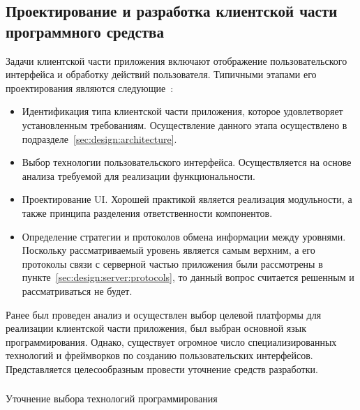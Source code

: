 \subsection{Проектирование и разработка клиентской части программного средства}
\label{sec:design:client}

Задачи клиентской части приложения включают отображение пользовательского интерфейса и обработку действий пользователя. Типичными этапами его проектирования являются следующие~\cite[с.~78]{applicationArchitectureGuide}:

\begin{itemize}
	\item Идентификация типа клиентской части приложения, которое удовлетворяет установленным требованиям. Осуществление данного этапа осуществлено в подразделе~\ref{sec:design:architecture}.
	\item Выбор технологии пользовательского интерфейса. Осуществляется на основе анализа требуемой для реализации функциональности.
	\item Проектирование UI. Хорошей практикой является реализация модульности, а также принципа разделения ответственности компонентов.
	\item Определение стратегии и протоколов обмена информации между уровнями. Поскольку рассматриваемый уровень является самым верхним, а его протоколы связи с серверной частью приложения были рассмотрены в пункте~\ref{sec:design:server:protocols}, то данный вопрос считается решенным и рассматриваться не будет.
\end{itemize}

Ранее был проведен анализ и осуществлен выбор целевой платформы для реализации клиентской части приложения, был выбран основной язык программирования. Однако, существует огромное число специализированных технологий и фреймворков по созданию пользовательских интерфейсов. Представляется целесообразным провести уточнение средств разработки.

\subsubsection{} Уточнение выбора технологий программирования
\label{sec:design:client:technologies}

